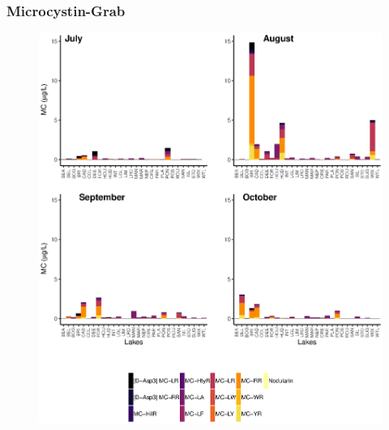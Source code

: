 \begin{frame}
	\frametitle{Microcystin-Grab}


	\begin{figure}
		\includegraphics[width=\textwidth,height=0.99\textheight]{1month.eps}
	\end{figure}

\end{frame}

